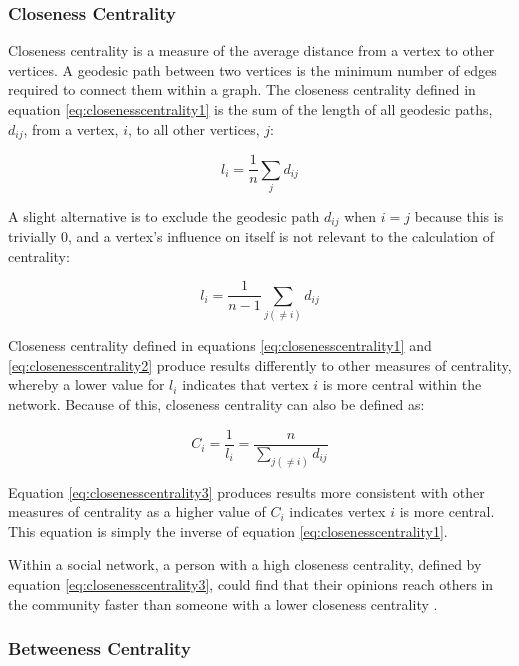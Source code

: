 \subsubsection{Closeness Centrality}
Closeness centrality is a measure of the average distance from a vertex to other vertices. A geodesic path between two vertices is the minimum number of edges required to connect them within a graph. The closeness centrality defined in equation \ref{eq:closenesscentrality1} is the sum of the length of all geodesic paths, $d_{ij}$, from a vertex, $i$, to all other vertices, $j$:

\begin{equation}
l_i = \frac{1}{n}\sum_{j} d_{ij}
\label{eq:closenesscentrality1}
\end{equation}

A slight alternative is to exclude the geodesic path $d_{ij}$ when $i = j$ because this is trivially 0, and a vertex's influence on itself is not relevant to the calculation of centrality:

\begin{equation}
l_i = \frac{1}{n-1}\sum_{j(\neq i)} d_{ij}
\label{eq:closenesscentrality2}
\end{equation}

Closeness centrality defined in equations \ref{eq:closenesscentrality1} and \ref{eq:closenesscentrality2} produce results differently to other measures of centrality, whereby a lower value for $l_i$ indicates that vertex $i$ is more central within the network. Because of this, closeness centrality can also be defined as:

\begin{equation}
C_i = \frac{1}{l_i} = \frac{n}{\sum_{j(\neq i)} d_{ij}}
\label{eq:closenesscentrality3}
\end{equation}

Equation \ref{eq:closenesscentrality3} produces results more consistent with other measures of centrality as a higher value of $C_i$ indicates vertex $i$ is more central. This equation is simply the inverse of equation \ref{eq:closenesscentrality1}.

Within a social network, a person with a high closeness centrality, defined by equation \ref{eq:closenesscentrality3}, could find that their opinions reach others in the community faster than someone with a lower closeness centrality \cite{newman10}.

\subsubsection{Betweeness Centrality}


